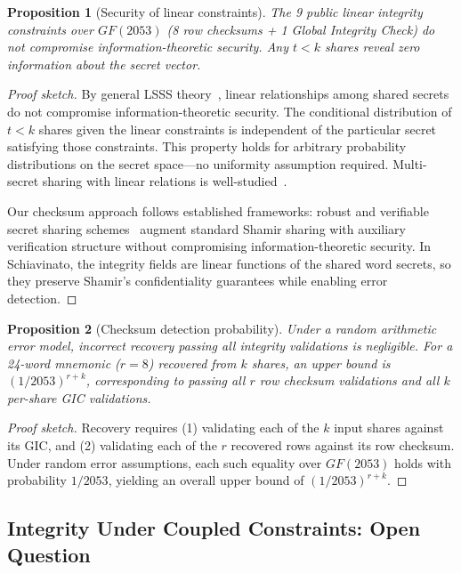 \documentclass[11pt]{article}
\newtheorem{proposition}{Proposition}[section]
\begin{document}
\begin{proposition}[Security of linear constraints]
\label{prop:linear}
The 9 public linear integrity constraints over $GF(2053)$ (8 row checksums + 1 Global Integrity Check) do not compromise information-theoretic security. Any $t < k$ shares reveal zero information about the secret vector.
\end{proposition}

\begin{proof}[Proof sketch]
By general LSSS theory~\cite{beimel2011,cramer2000}, linear relationships among shared secrets do not compromise information-theoretic security. The conditional distribution of $t < k$ shares given the linear constraints is independent of the particular secret satisfying those constraints. This property holds for arbitrary probability distributions on the secret space—no uniformity assumption required. Multi-secret sharing with linear relations is well-studied~\cite{blundo1993}.

Our checksum approach follows established frameworks: robust and verifiable secret sharing schemes~\cite{tompa1988,feldman1987} augment standard Shamir sharing with auxiliary verification structure without compromising information-theoretic security. In Schiavinato, the integrity fields are linear functions of the shared word secrets, so they preserve Shamir's confidentiality guarantees while enabling error detection.
\end{proof}

\begin{proposition}[Checksum detection probability]
\label{prop:checksum}
Under a random arithmetic error model, incorrect recovery passing all integrity validations is negligible. For a 24-word mnemonic ($r=8$) recovered from $k$ shares, an upper bound is $(1/2053)^{r+k}$, corresponding to passing all $r$ row checksum validations and all $k$ per-share GIC validations.
\end{proposition}

\begin{proof}[Proof sketch]
Recovery requires (1) validating each of the $k$ input shares against its GIC, and (2) validating each of the $r$ recovered rows against its row checksum. Under random error assumptions, each such equality over $GF(2053)$ holds with probability $1/2053$, yielding an overall upper bound of $(1/2053)^{r+k}$.
\end{proof}

\subsection{Integrity Under Coupled Constraints: Open Question}
\label{sec:integrity-question}
\end{document}
